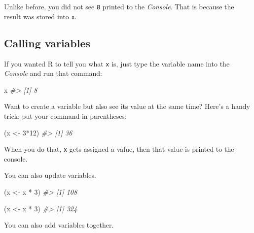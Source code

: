 \documentclass[
]{book}
\newenvironment{Shaded}{\begin{snugshade}}{\end{snugshade}}
\newcommand{\CommentTok}[1]{\textcolor[rgb]{0.56,0.35,0.01}{\textit{#1}}}
\newcommand{\DecValTok}[1]{\textcolor[rgb]{0.00,0.00,0.81}{#1}}
\newcommand{\NormalTok}[1]{#1}
\newcommand{\OtherTok}[1]{\textcolor[rgb]{0.56,0.35,0.01}{#1}}
\newcommand{\SpecialCharTok}[1]{\textcolor[rgb]{0.00,0.00,0.00}{#1}}
\begin{document}
Unlike before, you did not see \texttt{8} printed to the \emph{Console}. That is because the result was stored into \texttt{x}.

\hypertarget{calling-variables}{%
\subsection*{Calling variables}\label{calling-variables}}

If you wanted R to tell you what \texttt{x} is, just type the variable name into the \emph{Console} and run that command:

\begin{Shaded}
\begin{Highlighting}[]
\NormalTok{x}
\CommentTok{\#\textgreater{} [1] 8}
\end{Highlighting}
\end{Shaded}

Want to create a variable but also see its value at the same time? Here's a handy trick: put your command in parentheses:

\begin{Shaded}
\begin{Highlighting}[]
\NormalTok{(x }\OtherTok{\textless{}{-}} \DecValTok{3}\SpecialCharTok{*}\DecValTok{12}\NormalTok{)}
\CommentTok{\#\textgreater{} [1] 36}
\end{Highlighting}
\end{Shaded}

When you do that, \texttt{x} gets assigned a value, then that value is printed to the console.

You can also update variables.

\begin{Shaded}
\begin{Highlighting}[]
\NormalTok{(x }\OtherTok{\textless{}{-}}\NormalTok{ x }\SpecialCharTok{*} \DecValTok{3}\NormalTok{)}
\CommentTok{\#\textgreater{} [1] 108}
\end{Highlighting}
\end{Shaded}

\begin{Shaded}
\begin{Highlighting}[]
\NormalTok{(x }\OtherTok{\textless{}{-}}\NormalTok{ x }\SpecialCharTok{*} \DecValTok{3}\NormalTok{)}
\CommentTok{\#\textgreater{} [1] 324}
\end{Highlighting}
\end{Shaded}

You can also add variables together.
\end{document}
